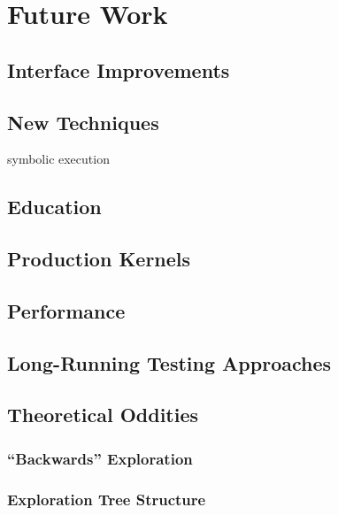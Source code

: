 \section{Future Work}
\label{sec:future}


\subsection{Interface Improvements}
\label{sec:future-interface}

\subsection{New Techniques}
\label{sec:future-new}

symbolic execution\cite{klee,dawson}

\subsection{Education}
\label{sec:future-education}

\subsection{Production Kernels}
\label{sec:future-linux}

\subsection{Performance}
\label{sec:future-perf}

\subsection{Long-Running Testing Approaches}
\label{sec:future-shaping}

\subsection{Theoretical Oddities}
\label{sec:future-theory}
\subsubsection{``Backwards'' Exploration}
\label{sec:future-backwards}
\subsubsection{Exploration Tree Structure}
